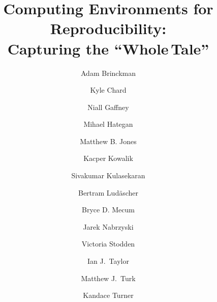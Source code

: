 \documentclass{elsarticle}
\newcommand{\wt}{Whole\,Tale}
\begin{document}
\begin{frontmatter}

\title{\textbf{Computing Environments for Reproducibility:\\Capturing the ``\wt''}}




\author[address5]{Adam Brinckman}
\author[address2]{Kyle Chard}
\author[address3]{Niall Gaffney}
\author[address2]{Mihael Hategan}
\author[address4]{Matthew B. Jones}
\author[address6]{Kacper Kowalik}
\author[address3]{Sivakumar Kulasekaran}
\author[address1,address6]{Bertram Lud\"ascher}
\author[address4]{Bryce D. Mecum}
\author[address5]{Jarek Nabrzyski}
\author[address1,address6]{Victoria Stodden}
\author[address5,address7]{Ian J.~Taylor}
\author[address1,address6]{Matthew J.~Turk}
\author[address6]{Kandace Turner}  
\address[address1]{School of Information Sciences, University of Illinois at Urbana-Champaign}
\address[address2]{Computation Institute, University of Chicago and Argonne National Laboratory}
\address[address3]{Texas Advanced Computing Center, University of Texas at Austin}
\address[address4]{National Center for Ecological Analysis and Synthesis, University of California at Santa Barbara}
\address[address5]{Center for Research Computing, University of Notre Dame}
\address[address6]{National Center for Supercomputing Applications, University of Illinois at Urbana-Champaign}
\address[address7]{School of Computer Science, Cardiff University, Cardiff, UK}




\end{frontmatter}
\end{document}
